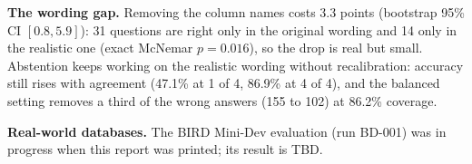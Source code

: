 \textbf{The wording gap.} Removing the column names costs 3.3 points (bootstrap 95\% CI $[0.8, 5.9]$): 31 questions are right only in the original wording and 14 only in the realistic one (exact McNemar $p = 0.016$), so the drop is real but small. Abstention keeps working on the realistic wording without recalibration: accuracy still rises with agreement (47.1\% at 1 of 4, 86.9\% at 4 of 4), and the balanced setting removes a third of the wrong answers (155 to 102) at 86.2\% coverage.

\textbf{Real-world databases.} The BIRD Mini-Dev evaluation (run BD-001) was in progress when this report was printed; its result is TBD.

